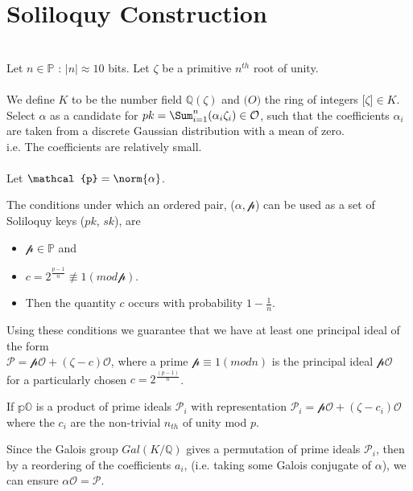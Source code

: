 \documentclass{article}
\begin{document}
\section{Soliloquy Construction}
\\
Let $n \in \mathbb{P}$ : $|n| \approx 10$ bits.
Let $\zeta$ be a primitive $n^{th}$ root of unity.
\\ \\
We define $K$ to be the number field $\mathbb{Q}(\zeta)$ and $\mathcal(O)$ the ring of integers $\mathbb[\zeta] \in K$. 
\\
Select $\alpha$ as a candidate for $pk = \Sum_{i=1}^{n} (\alpha_{i} \zeta_{i}) \in \mathcal{O}$, such that the coefficients $\alpha_{i}$ are taken from a discrete Gaussian distribution with a mean of zero. \\ 
i.e. The coefficients are relatively small. 
\\ \\
Let $\mathcal{p}=\norm{\alpha}$.

The conditions under which an ordered pair, ($\alpha, \mathcal{p}$) can be used as a set of Soliloquy keys ($pk$, $sk$), are 
\begin{itemize}
\item $\mathcal{p} \in \mathbb{P}$  and 
\item $c=2^{\frac{p-1}{n}} \nequiv 1(mod \mathcal{p})$.
\item Then the quantity $c$ occurs with probability $1-\frac{1}{n}$. 
\end{itemize}

Using these conditions we guarantee that we have at least one principal ideal of the form \\ $\mathcal{P} = \mathcal{pO}+(\zeta-c)\mathcal{O}$, where a prime $\mathcal{p} \equiv 1(mod n)$ is the principal ideal $\mathcal{pO}$ \\ for a particularly chosen $c=2^{\frac{(p-1)}{n}}$. 

If $\mathbb{pO}$ is a product of prime ideals $\mathcal{P}_{i}$ with representation $\mathcal{P}_{i} = \mathcal{pO} + (\zeta-c_{i}) \mathcal{O}$ where the $c_{i}$ are the non-trivial $n_{th}$ of unity mod $p$. 

Since the Galois group $Gal(K/\mathbb{Q})$ gives a permutation of prime ideals $\mathcal{P}_{i}$, then by a reordering of the coefficients $a_{i}$, (i.e. taking some Galois conjugate of $\alpha$), we can ensure $\alpha \mathcal{O} = \mathcal{P}$. \\ 
\end{document}
